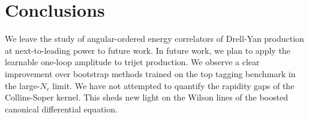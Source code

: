 \section{Conclusions}\label{sec:conclusions}

We leave the study of angular-ordered energy correlators of Drell-Yan
production at next-to-leading power to future work. In future work, we
plan to apply the learnable one-loop amplitude to trijet production. We
observe a clear improvement over bootstrap methods trained on the top
tagging benchmark in the large-$N_c$ limit. We have not attempted to
quantify the rapidity gaps of the Collins-Soper kernel. This sheds new
light on the Wilson lines of the boosted canonical differential
equation.


